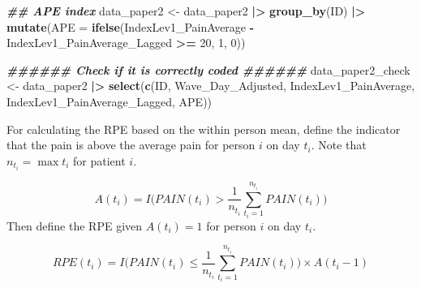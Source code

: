 \documentclass[
  12pt,
]{article}
\newenvironment{Shaded}{\begin{snugshade}}{\end{snugshade}}
\newcommand{\AttributeTok}[1]{\textcolor[rgb]{0.13,0.29,0.53}{#1}}
\newcommand{\DecValTok}[1]{\textcolor[rgb]{0.00,0.00,0.81}{#1}}
\newcommand{\DocumentationTok}[1]{\textcolor[rgb]{0.56,0.35,0.01}{\textbf{\textit{#1}}}}
\newcommand{\FunctionTok}[1]{\textcolor[rgb]{0.13,0.29,0.53}{\textbf{#1}}}
\newcommand{\NormalTok}[1]{#1}
\newcommand{\OtherTok}[1]{\textcolor[rgb]{0.56,0.35,0.01}{#1}}
\newcommand{\SpecialCharTok}[1]{\textcolor[rgb]{0.81,0.36,0.00}{\textbf{#1}}}
\begin{document}
\begin{Shaded}
\begin{Highlighting}[]
\DocumentationTok{\#\# APE index}
\NormalTok{data\_paper2 }\OtherTok{\textless{}{-}}\NormalTok{ data\_paper2 }\SpecialCharTok{|\textgreater{}}
  \FunctionTok{group\_by}\NormalTok{(ID) }\SpecialCharTok{|\textgreater{}}
  \FunctionTok{mutate}\NormalTok{(}\AttributeTok{APE =} \FunctionTok{ifelse}\NormalTok{(IndexLev1\_PainAverage }\SpecialCharTok{{-}}\NormalTok{ IndexLev1\_PainAverage\_Lagged }\SpecialCharTok{\textgreater{}=} \DecValTok{20}\NormalTok{, }\DecValTok{1}\NormalTok{, }\DecValTok{0}\NormalTok{))}

\DocumentationTok{\#\#\#\#\#\# Check if it is correctly coded \#\#\#\#\#\#}
\NormalTok{data\_paper2\_check }\OtherTok{\textless{}{-}}\NormalTok{ data\_paper2 }\SpecialCharTok{|\textgreater{}}
  \FunctionTok{select}\NormalTok{(}\FunctionTok{c}\NormalTok{(ID, Wave\_Day\_Adjusted, }
\NormalTok{           IndexLev1\_PainAverage, }
\NormalTok{           IndexLev1\_PainAverage\_Lagged, }
\NormalTok{           APE))}
\end{Highlighting}
\end{Shaded}

For calculating the RPE based on the within person mean, define the
indicator that the pain is above the average pain for person \(i\) on
day \(t_i\). Note that \(n_{t_i}=\max{t_i}\) for patient \(i\).

\[
A(t_i)=I\Big(PAIN(t_i)>\frac{1}{n_{t_i}}\sum_{t_i=1}^{n_{t_i}}PAIN(t_i)\Big)
\] Then define the RPE given \(A(t_i)=1\) for person \(i\) on day
\(t_i\).

\[
RPE(t_i)=I\Big(PAIN(t_i)\leq \frac{1}{n_{t_i}}\sum_{t_i=1}^{n_{t_i}}PAIN(t_i)\Big)\times A(t_i-1)
\]
\end{document}
